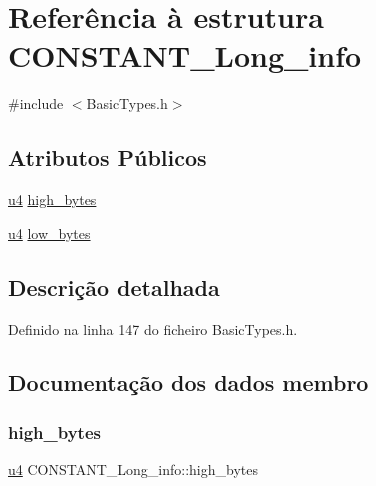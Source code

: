 \hypertarget{structCONSTANT__Long__info}{}\section{Referência à estrutura C\+O\+N\+S\+T\+A\+N\+T\+\_\+\+Long\+\_\+info}
\label{structCONSTANT__Long__info}


{\ttfamily \#include $<$Basic\+Types.\+h$>$}

\subsection*{Atributos Públicos}
\begin{DoxyCompactItemize}
\item 
\hyperlink{BasicTypes_8h_ae5be1f726785414dd1b77d60df074c9d}{u4} \hyperlink{structCONSTANT__Long__info_a66063744fe69754154de824b1d4bcf31}{high\+\_\+bytes}
\item 
\hyperlink{BasicTypes_8h_ae5be1f726785414dd1b77d60df074c9d}{u4} \hyperlink{structCONSTANT__Long__info_aafb2c41b1cf577fab97718cf51e0c00f}{low\+\_\+bytes}
\end{DoxyCompactItemize}


\subsection{Descrição detalhada}


Definido na linha 147 do ficheiro Basic\+Types.\+h.



\subsection{Documentação dos dados membro}
\mbox{\label{structCONSTANT__Long__info_a66063744fe69754154de824b1d4bcf31}} 
\subsubsection{\texorpdfstring{high\+\_\+bytes}{high\_bytes}}
{\footnotesize\ttfamily \hyperlink{BasicTypes_8h_ae5be1f726785414dd1b77d60df074c9d}{u4} C\+O\+N\+S\+T\+A\+N\+T\+\_\+\+Long\+\_\+info\+::high\+\_\+bytes}



